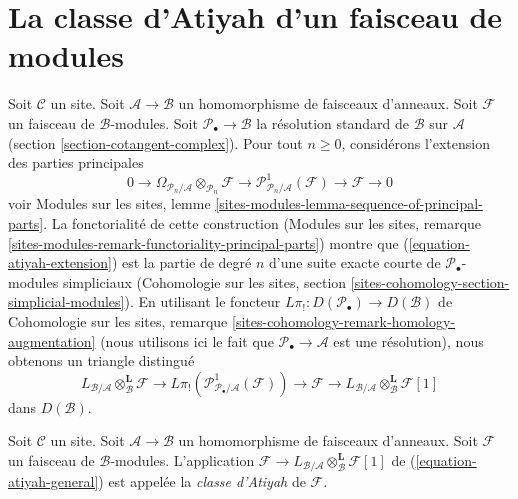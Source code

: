 










\section{La classe d'Atiyah d'un faisceau de modules}
\label{section-atiyah-general}

\noindent
Soit $\mathcal{C}$ un site. Soit $\mathcal{A} \to \mathcal{B}$ un
homomorphisme de faisceaux d'anneaux. Soit $\mathcal{F}$ un faisceau de
$\mathcal{B}$-modules. Soit $\mathcal{P}_\bullet \to \mathcal{B}$ la
résolution standard de $\mathcal{B}$ sur $\mathcal{A}$ (section
\ref{section-cotangent-complex}). Pour tout $n \geq 0$, considérons l'extension
des parties principales
\begin{equation}
\label{equation-atiyah-extension}
0 \to
\Omega_{\mathcal{P}_n/\mathcal{A}} \otimes_{\mathcal{P}_n} \mathcal{F} \to
\mathcal{P}^1_{\mathcal{P}_n/\mathcal{A}}(\mathcal{F}) \to
\mathcal{F} \to 0
\end{equation}
voir Modules sur les sites, lemme
\ref{sites-modules-lemma-sequence-of-principal-parts}. La fonctorialité de
cette construction (Modules sur les sites, remarque
\ref{sites-modules-remark-functoriality-principal-parts}) montre que
(\ref{equation-atiyah-extension}) est la partie de degré $n$ d'une suite
exacte courte de $\mathcal{P}_\bullet$-modules simpliciaux (Cohomologie sur les
sites, section \ref{sites-cohomology-section-simplicial-modules}). En utilisant
le foncteur $L\pi_! : D(\mathcal{P}_\bullet) \to D(\mathcal{B})$ de Cohomologie
sur les sites, remarque \ref{sites-cohomology-remark-homology-augmentation}
(nous utilisons ici le fait que $\mathcal{P}_\bullet \to \mathcal{A}$ est une
résolution), nous obtenons un triangle distingué
\begin{equation}
\label{equation-atiyah-general}
L_{\mathcal{B}/\mathcal{A}} \otimes_\mathcal{B}^\mathbf{L} \mathcal{F} \to
L\pi_!\left(\mathcal{P}^1_{\mathcal{P}_\bullet/\mathcal{A}}(\mathcal{F})\right)
\to \mathcal{F} \to
L_{\mathcal{B}/\mathcal{A}} \otimes_\mathcal{B}^\mathbf{L} \mathcal{F} [1]
\end{equation}
dans $D(\mathcal{B})$.

\begin{definition}
\label{definition-atiyah-class-general}
Soit $\mathcal{C}$ un site. Soit $\mathcal{A} \to \mathcal{B}$ un
homomorphisme de faisceaux d'anneaux. Soit $\mathcal{F}$ un faisceau de
$\mathcal{B}$-modules. L'application $\mathcal{F} \to
L_{\mathcal{B}/\mathcal{A}} \otimes_\mathcal{B}^\mathbf{L} \mathcal{F}[1]$
de (\ref{equation-atiyah-general}) est appelée la {\it classe d'Atiyah} de
$\mathcal{F}$.
\end{definition}









